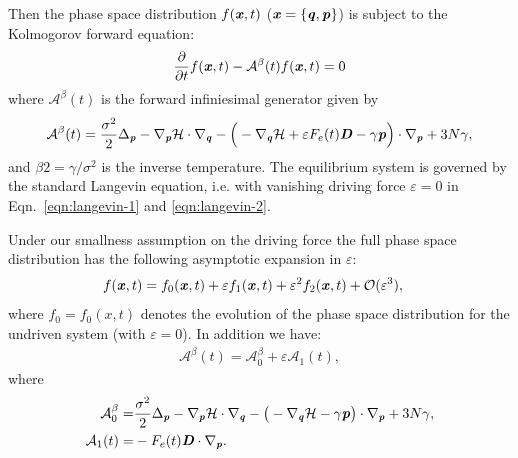 \documentclass[aip,jcp,a4paper,reprint,onecolumn]{revtex4-1}
\newcommand{\vect}[1]{\textbf{\textit{#1}}}
\newcommand{\mh}{\mathcal H}
\newcommand{\eps}{\varepsilon}
\newcommand{\mo}{\mathcal O}
\newcommand{\fwg}{{\mathcal A}}
\begin{document}
Then the phase space distribution $f(\vect x, t)$ ($\vect x = \{\vect
q, \vect p\}$) is subject to the Kolmogorov forward equation:
\begin{align}\label{eqn:orig-forward}
  \frac{\partial}{\partial t} f(\vect x, t) - \fwg^\beta(t) f(\vect x, t) = 0
\end{align}
where $\fwg^\beta(t)$ is the forward infiniesimal generator given by
\begin{align}
  \fwg^\beta(t) =
  \frac{\sigma^2}2\Delta_{\vect p}
  - \nabla_{\vect p}\mh 
  \cdot\nabla_{\vect q}
  - \Big(
  -\nabla_{\vect q}\mh +
  \eps F_e(t)  \vect D  - \gamma\vect p
  \Big)\cdot\nabla_{\vect p}
  + 3N\gamma,
\end{align}
and $\beta2=\gamma / \sigma^2$ is the inverse temperature.
The equilibrium system
is governed by
the standard Langevin equation, i.e. with
vanishing driving force $\eps = 0$ in
Eqn.~\eqref{eqn:langevin-1} and \eqref{eqn:langevin-2}.

Under our smallness assumption on the driving force the full phase space distribution has the following asymptotic expansion in $\eps$:
\begin{align}\label{eqn:f-expan}
  f(\vect x, t) &= f_0(\vect x, t) + \eps f_1(\vect x, t)
  +\eps^2 f_2(\vect x, t) + \mo (\eps^3),
\end{align}
where $f_0=f_0(x,t)$ denotes the evolution of the phase space distribution for the undriven system (with $\eps=0$).
In addition we have:
\begin{align}\label{eqn:A-expan}
  \fwg^\beta(t) = \fwg^\beta_0 + \eps\fwg_1(t),
\end{align}
where
\begin{align}
  \fwg_0^\beta =&
  \frac{\sigma^2}2\Delta_{\vect p}
  -
  \nabla_{\vect p}\mh\cdot\nabla_{\vect q}
  - \big(
  -\nabla_{\vect q}\mh - \gamma\vect p
  \big)\cdot\nabla_{\vect p}
  + 3N\gamma,\\
  \fwg_1(t) =&
  - F_e(t)  \vect D \cdot\nabla_{\vect p}.
\end{align}
\end{document}
